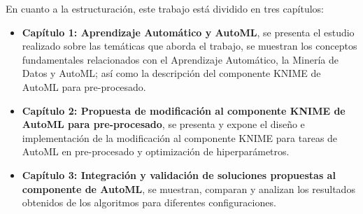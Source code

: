 En cuanto a la estructuración, este trabajo está dividido en tres capítulos:
\begin{itemize}
	\item \textbf{Capítulo 1: Aprendizaje Automático y AutoML}, se presenta el estudio realizado sobre las temáticas que aborda el trabajo, se muestran los conceptos fundamentales relacionados con el Aprendizaje Automático, la Minería de Datos y AutoML; así como la descripción del componente KNIME de AutoML para pre-procesado.
	\item \textbf{Capítulo 2: Propuesta de modificación al componente KNIME de AutoML para pre-procesado}, se presenta y expone el diseño e implementación de la modificación al componente KNIME para tareas de AutoML en pre-procesado y optimización de hiperparámetros.
		\item \textbf{Capítulo 3: Integración y validación de soluciones propuestas al componente de AutoML}, se muestran, comparan y analizan los resultados obtenidos de los algoritmos para diferentes configuraciones.
\end{itemize}







